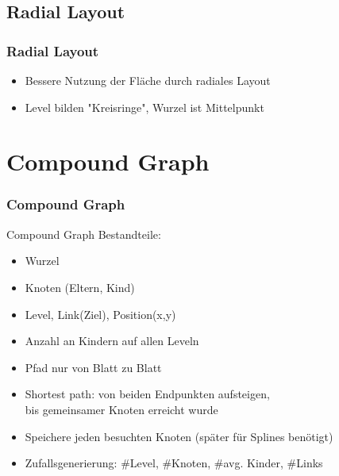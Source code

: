 \documentclass[11pt]{beamer}
\begin{document}
\subsection{Radial Layout}
\begin{frame}
\frametitle{Radial Layout}

\begin{itemize}
\item Bessere Nutzung der Fläche durch radiales Layout
\item Level bilden "Kreisringe", Wurzel ist Mittelpunkt
\end{itemize}
\end{frame}

\section{Compound Graph}
\begin{frame}[allowframebreaks]
\frametitle{Compound Graph}

Compound Graph Bestandteile:
\begin{itemize} 
\item Wurzel
\item Knoten (Eltern, Kind)                                                                                                                       
\item Level, Link(Ziel), Position(x,y)
\item Anzahl an Kindern auf allen Leveln
\end{itemize}

\framebreak
\begin{itemize} 
\item Pfad nur von Blatt zu Blatt
\item Shortest path: von beiden Endpunkten aufsteigen, \\ bis gemeinsamer Knoten erreicht wurde
\item Speichere jeden besuchten Knoten (später für Splines benötigt)
\item Zufallsgenerierung: \#Level, \#Knoten, \#avg. Kinder, \#Links
\end{itemize}


\end{frame}
\end{document}
